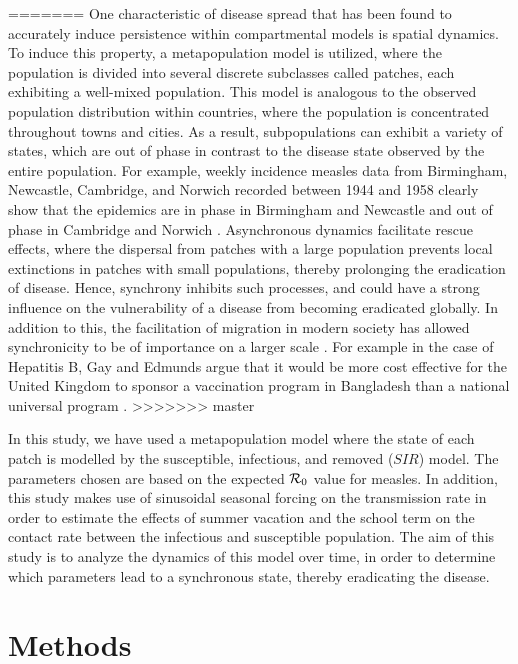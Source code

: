 \documentclass[twocolumn,nofootinbib,showkeys,twoside,floatfix,unsortedaddress,flushbottom,10pt,aps,pra]{report}
\begin{document}
=======
One characteristic of disease spread that has been found to accurately induce persistence within compartmental models is spatial dynamics. To induce this property, a metapopulation model is utilized, where the population is divided into several discrete subclasses called patches, each exhibiting a well-mixed population. This model is analogous to the observed population distribution within countries, where the population is concentrated throughout towns and cities. As a result, subpopulations can exhibit a variety of states, which are out of phase in contrast to the disease state observed by the entire population. For example, weekly incidence measles data from Birmingham, Newcastle, Cambridge, and Norwich recorded between 1944 and 1958 clearly show that the epidemics are in phase in Birmingham and Newcastle and out of phase in Cambridge and Norwich \cite{Grenfell2001}. Asynchronous dynamics facilitate rescue effects, where the dispersal from patches with a large population prevents local extinctions in patches with small populations, thereby prolonging the eradication of disease. Hence, synchrony inhibits such processes, and could have a strong influence on the vulnerability of a disease from becoming eradicated globally. In addition to this, the facilitation of migration in modern society has allowed synchronicity to be of importance on a larger scale \cite{McCluskey2011}. For example in the case of Hepatitis B, Gay and Edmunds argue that it would be more cost effective for the United Kingdom to sponsor a vaccination program in Bangladesh than a national universal program \cite{Burton2012}. 
>>>>>>> master
\par
\smallskip \qquad
In this study, we have used a metapopulation model where the state of each patch is modelled by the susceptible, infectious, and removed ($SIR$) model. The parameters chosen are based on the expected ${\cal R}_0$ value for measles. In addition, this study makes use of sinusoidal seasonal forcing \cite{olsen1990chaos} on the transmission rate in order to estimate the effects of summer vacation and the school term on the contact rate between the infectious and susceptible population. The aim of this study is to analyze the dynamics of this model over time, in order to determine which parameters lead to a synchronous state, thereby eradicating the disease. \par
\smallskip

\section{Methods}
\end{document}
